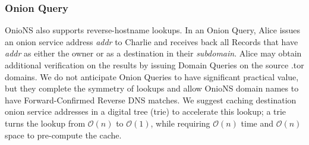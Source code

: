 \documentclass[USenglish,oneside,twocolumn]{article}
\begin{document}
\subsubsection{Onion Query}

OnioNS also supports reverse-hostname lookups. In an Onion Query, Alice issues an onion service address \emph{addr} to Charlie and receives back all Records that have \emph{addr} as either the owner or as a destination in their \emph{subdomain}. Alice may obtain additional verification on the results by issuing Domain Queries on the source .tor domains. We do not anticipate Onion Queries to have significant practical value, but they complete the symmetry of lookups and allow OnioNS domain names to have Forward-Confirmed Reverse DNS matches. We suggest caching destination onion service addresses in a digital tree (trie) to accelerate this lookup; a trie turns the lookup from $ \mathcal{O}(n) $ to $ \mathcal{O}(1) $, while requiring $ \mathcal{O}(n) $ time and $ \mathcal{O}(n) $ space to pre-compute the cache.



\end{document}
